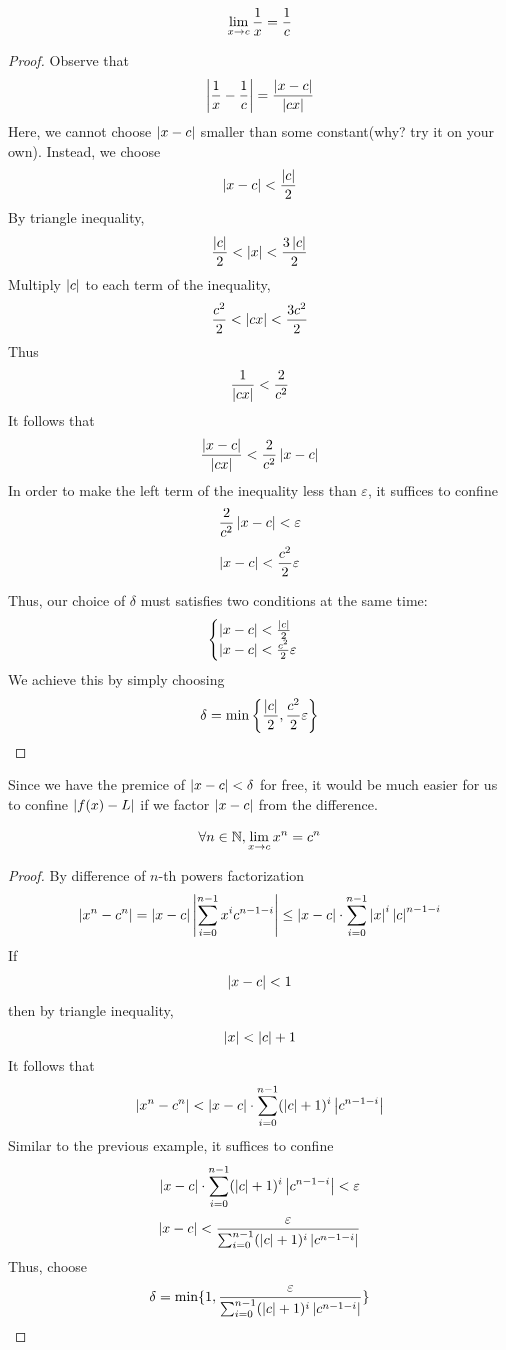 \documentclass[a4paper,12pt]{article}
\begin{document}
\newpage
\begin{example}[Harder]
    \[\lim_{x\rightarrow c} {\frac{1}{x}}=\frac{1}{c}\]
    \begin{proof}        
        Observe that
        \[\left\lvert \frac{1}{x }-\frac{1}{c}\right\rvert=\frac{\left\lvert x-c\right\rvert}{\left\lvert cx\right\rvert}\]
        Here, we cannot choose \(\left\lvert x-c\right\rvert\) smaller than some constant(why? try it on your own). Instead,
        we choose \[\left\lvert x-c\right\rvert<\frac{\left\lvert c \right\rvert}{2 }\]
        By triangle inequality,
        \[\frac{\left\lvert c \right\rvert}{2 }<\left\lvert x\right\rvert<\frac{3\left\lvert c \right\rvert}{2 }\]
        Multiply \(\left\lvert c\right\rvert\) to each term of the inequality,
        \[\frac{c^2}{2 }<\left\lvert cx\right\rvert<\frac{3c^2}{2 }\]
        Thus
        \[\frac{1 }{\left\lvert cx \right\rvert}<\frac{2 }{c^2 }\]
        It follows that 
        \[\frac{\left\lvert x-c \right\rvert}{\left\lvert cx \right\rvert}<\frac{2}{c^2}\left\lvert x-c \right\rvert\]
        In order to make the left term of the inequality less than \(\varepsilon\), 
        it suffices to confine 
        \[\frac{2}{c^2}\left\lvert x-c\right\rvert<\varepsilon\]
        \[\left\lvert x-c\right\rvert<\frac{c^2}{2}\varepsilon\]

        Thus, our choice of \(\delta\) must satisfies two conditions at the same time:
        \begin{equation*}
            \begin{cases}
                \left\lvert x-c\right\rvert<\frac{\left\lvert c \right\rvert}{2 } \\
                \left\lvert x-c\right\rvert<\frac{c^2}{2}\varepsilon
            \end{cases}
        \end{equation*}
        We achieve this by simply choosing
        \[\delta=\min\left\{\frac{\left\lvert c \right\rvert}{2 },\frac{c^2}{2}\varepsilon\right\}\]

    \end{proof}
\end{example}

\begin{remark}
    Since we have the premice of \(\left\lvert x-c \right\rvert<\delta\) for free, it would be much easier for us to 
    confine \(\left\lvert f(x)-L\right\rvert\) if we factor \(\left\lvert x-c\right\rvert\) from the difference.
\end{remark}

\newpage

\begin{example}
    \[\forall n\in\mathbb{N}, \lim_{x\rightarrow c } {x^n }=c^n\]
    \begin{proof}
        By difference of \(n\)-th powers factorization
        \[\left\lvert x^n-c^n \right\rvert=\left\lvert x-c\right\rvert\left\lvert \sum_{i=0}^{n-1 }x^i c^{n-1-i}\right\rvert\le \left\lvert x-c \right\rvert\cdot\sum_{i=0}^{n-1 }\left\lvert x\right\rvert^i \left\lvert c\right\rvert^{n-1-i}\]
        If \[\left\lvert x-c \right\rvert<1\]
        then by triangle inequality,
        \[\left\lvert x \right\rvert<\left\lvert c \right\rvert+1\]
        It follows that
        \[\left\lvert x^n-c^n\right\rvert<\left\lvert x-c\right\rvert\cdot\sum_{i=0}^{n-1 }(\left\lvert c\right\rvert+1)^i \left\lvert c^{n-1-i}\right\rvert\]
        Similar to the previous example, it suffices to confine 
        \[\left\lvert x-c\right\rvert\cdot\sum_{i=0}^{n-1 }(\left\lvert c\right\rvert+1)^i \left\lvert c^{n-1-i}\right\rvert<\varepsilon\] 
        \[\left\lvert x-c\right\rvert<\frac{\varepsilon}{\sum_{i=0}^{n-1 }(\left\lvert c\right\rvert+1)^i \left\lvert c^{n-1-i}\right\rvert}\]
        Thus, choose 
        \[\delta =\min\{1, \frac{\varepsilon}{\sum_{i=0}^{n-1 }(\left\lvert c\right\rvert+1)^i \left\lvert c^{n-1-i}\right\rvert}\}\]
    \end{proof}
\end{example}
\end{document}
